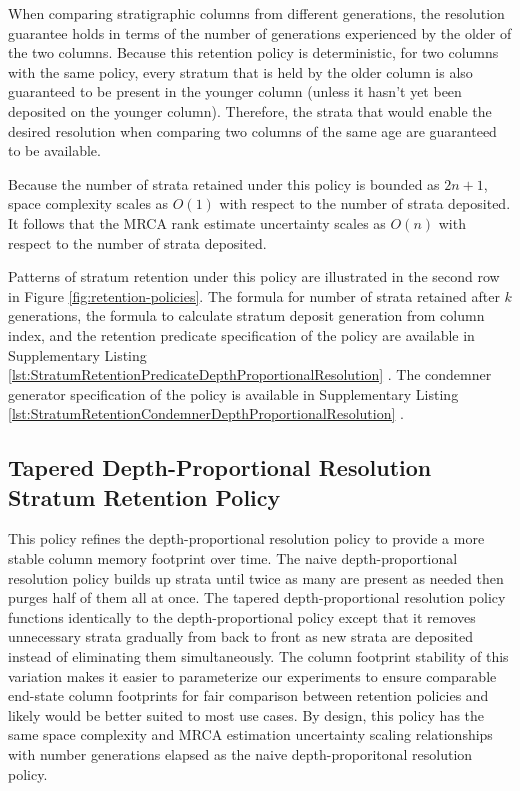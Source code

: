 When comparing stratigraphic columns from different generations, the resolution guarantee holds in terms of the number of generations experienced by the older of the two columns.
Because this retention policy is deterministic, for two columns with the same policy, every stratum that is held by the older column is also guaranteed to be present in the younger column (unless it hasn't yet been deposited on the younger column).
Therefore, the strata that would enable the desired resolution when comparing two columns of the same age are guaranteed to be available.

Because the number of strata retained under this policy is bounded as $2n+1$, space complexity scales as $O(1)$ with respect to the number of strata deposited.
It follows that the MRCA rank estimate uncertainty scales as $O(n)$ with respect to the number of strata deposited.

Patterns of stratum retention under this policy are illustrated in the second row in Figure \ref{fig:retention-policies}.
The formula for number of strata retained after $k$ generations, the formula to calculate stratum deposit generation from column index, and the retention predicate specification of the policy are available in Supplementary Listing \ref{lst:StratumRetentionPredicateDepthProportionalResolution} \citep{moreno2022hstratconceptsupplement}.
The condemner generator specification of the policy is available in Supplementary Listing \ref{lst:StratumRetentionCondemnerDepthProportionalResolution} \citep{moreno2022hstratconceptsupplement}.

\subsection{Tapered Depth-Proportional Resolution Stratum Retention Policy}

This policy refines the depth-proportional resolution policy to provide a more stable column memory footprint over time.
The naive depth-proportional resolution policy builds up strata until twice as many are present as needed then purges half of them all at once.
The tapered depth-proportional resolution policy functions identically to the depth-proportional policy except that it removes unnecessary strata gradually from back to front as new strata are deposited instead of eliminating them simultaneously.
The column footprint stability of this variation makes it easier to parameterize our experiments to ensure comparable end-state column footprints for fair comparison between retention policies and likely would be better suited to most use cases.
By design, this policy has the same space complexity and MRCA estimation uncertainty scaling relationships with number generations elapsed as the naive depth-proporitonal resolution policy.

